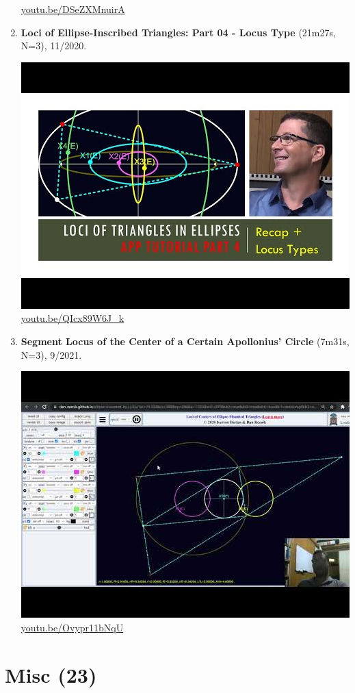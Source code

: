 \documentclass[12pt]{amsart}
\begin{document}
\begin{enumerate}[resume]
\begin{center}
\href{https://youtu.be/DSeZXMnuirA}{\url{youtu.be/DSeZXMnuirA}}\end{center}
% 
\item \textbf{Loci of Ellipse-Inscribed Triangles: Part 04 - Locus Type} (21m27s, N=3), 11/2020. 
\begin{center}\includegraphics[width=.5\textwidth]{pics/QIcx89W6J_k.jpg} \\ 
\href{https://youtu.be/QIcx89W6J_k}{\url{youtu.be/QIcx89W6J\_k}}\end{center}
% 
\item \textbf{Segment Locus of the Center of a Certain Apollonius' Circle} (7m31s, N=3), 9/2021. 
\begin{center}\includegraphics[width=.5\textwidth]{pics/Ovypr11bNqU.jpg} \\ 
\href{https://youtu.be/Ovypr11bNqU}{\url{youtu.be/Ovypr11bNqU}}\end{center}
% 
\end{enumerate}

\section{Misc (23)}
\end{document}
